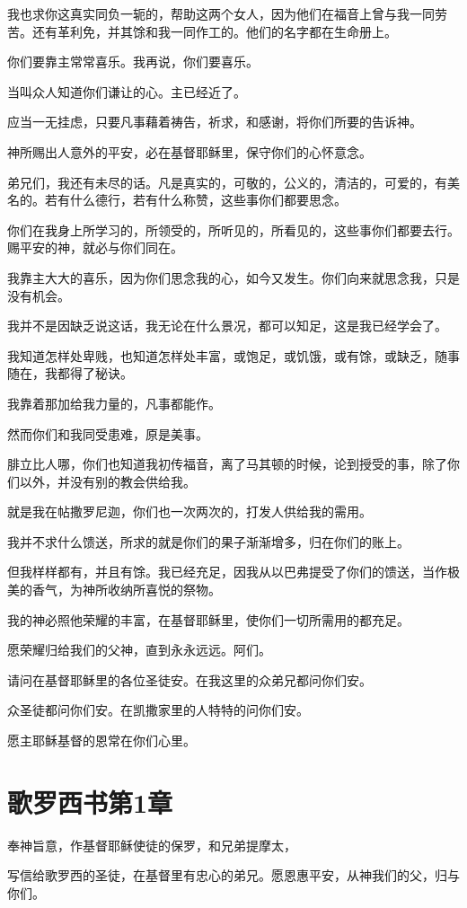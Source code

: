\documentclass[12pt,oneside]{book}
\begin{document}
我也求你这真实同负一轭的，帮助这两个女人，因为他们在福音上曾与我一同劳苦。还有革利免，并其馀和我一同作工的。他们的名字都在生命册上。

你们要靠主常常喜乐。我再说，你们要喜乐。

当叫众人知道你们谦让的心。主已经近了。

应当一无挂虑，只要凡事藉着祷告，祈求，和感谢，将你们所要的告诉神。

神所赐出人意外的平安，必在基督耶稣里，保守你们的心怀意念。

弟兄们，我还有未尽的话。凡是真实的，可敬的，公义的，清洁的，可爱的，有美名的。若有什么德行，若有什么称赞，这些事你们都要思念。

你们在我身上所学习的，所领受的，所听见的，所看见的，这些事你们都要去行。赐平安的神，就必与你们同在。

我靠主大大的喜乐，因为你们思念我的心，如今又发生。你们向来就思念我，只是没有机会。

我并不是因缺乏说这话，我无论在什么景况，都可以知足，这是我已经学会了。

我知道怎样处卑贱，也知道怎样处丰富，或饱足，或饥饿，或有馀，或缺乏，随事随在，我都得了秘诀。

我靠着那加给我力量的，凡事都能作。

然而你们和我同受患难，原是美事。

腓立比人哪，你们也知道我初传福音，离了马其顿的时候，论到授受的事，除了你们以外，并没有别的教会供给我。

就是我在帖撒罗尼迦，你们也一次两次的，打发人供给我的需用。

我并不求什么馈送，所求的就是你们的果子渐渐增多，归在你们的账上。

但我样样都有，并且有馀。我已经充足，因我从以巴弗提受了你们的馈送，当作极美的香气，为神所收纳所喜悦的祭物。

我的神必照他荣耀的丰富，在基督耶稣里，使你们一切所需用的都充足。

愿荣耀归给我们的父神，直到永永远远。阿们。

请问在基督耶稣里的各位圣徒安。在我这里的众弟兄都问你们安。

众圣徒都问你们安。在凯撒家里的人特特的问你们安。

愿主耶稣基督的恩常在你们心里。

\chapter{歌罗西书第1章}
奉神旨意，作基督耶稣使徒的保罗，和兄弟提摩太，

写信给歌罗西的圣徒，在基督里有忠心的弟兄。愿恩惠平安，从神我们的父，归与你们。
\end{document}
